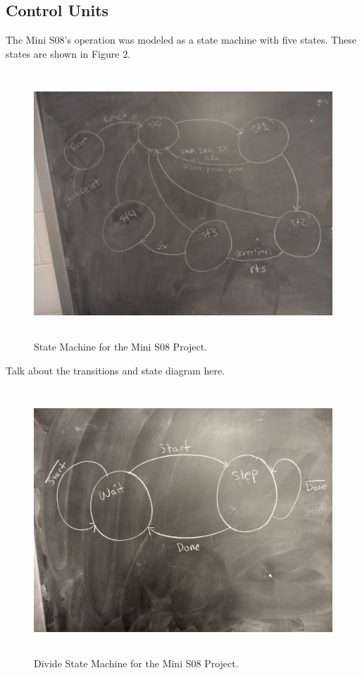 \documentclass[letterpaper, 12pt]{article}
\begin{document}
\begin{flushleft}
\section*{Control Units}
The Mini S08's operation was modeled as a state machine with five states.  These states are shown in Figure 2.
 \begin{figure}[H]
	\includegraphics[width=\linewidth,height=10cm,keepaspectratio]{s08_states.jpg}
	\caption[Mini S08 State Machine Diagram]{State Machine for the Mini S08 Project.}
	\label{fig:arch}
\end{figure}

\newpage
Talk about the transitions and state diagram here.
\newpage
 \begin{figure}[H]
	\includegraphics[width=\linewidth,height=10cm,keepaspectratio]{divide_states.jpg}
	\caption[Mini S08 Division State Machine Diagram]{Divide State Machine for the Mini S08 Project.}
	\label{fig:arch}
\end{figure}


\end{flushleft}
\end{document}
